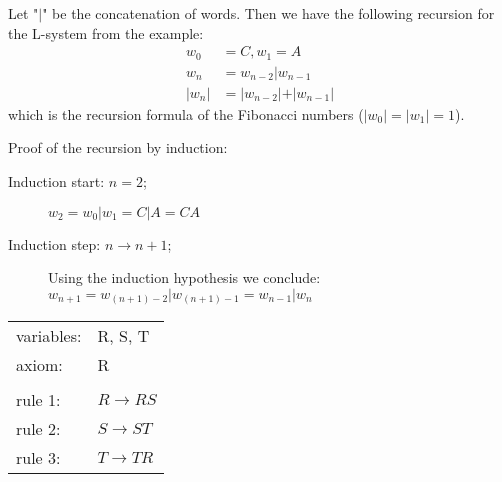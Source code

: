 \documentclass[10pt,a4paper,boxed]{hmcpset}
\begin{document}
\begin{problem}[Assignment 24]
\end{problem}
\begin{solution}
\end{solution}

\begin{problem}[Assignment 25]
\end{problem}
\begin{solution}
\end{solution}

\begin{problem}[Assignment 26]
\end{problem}
\begin{solution}
\end{solution}

\begin{problem}[Assignment 27]
\end{problem}
\begin{solution}
Let "$\vert$" be the concatenation of words. Then we have the following recursion for the L-system from the example:\\
\begin{align*}
	w_0 & = C, w_1 = A\\
	w_n & = w_{n-2} \vert w_{n-1} \\
	\vert w_n \vert & = \vert w_{n-2} \vert + \vert w_{n-1} \vert
\end{align*}
which is the recursion formula of the Fibonacci numbers ($\vert w_0 \vert = \vert w_1 \vert = 1$).

Proof of the recursion by induction:
	\begin{description}
		\item[Induction start: $n=2$;] $w_2 = w_0 \vert w_1 = C \vert A = CA$
		\item[Induction step: $n \rightarrow n+1$;] Using the induction hypothesis we conclude: $w_{n+1} = w_{(n+1)-2} \vert w_{(n+1)-1} = w_{n-1} \vert w_n$
	\end{description}
\end{solution}

\begin{problem}[Assignment 28]
\end{problem}
\begin{solution}
	\begin{tabular}{ll}
	 variables: & R, S, T\\ 
	 axiom: & R \\
	 		& \\
	 rule 1: & $R \rightarrow RS$ \\
	 rule 2: & $S \rightarrow ST$ \\
	 rule 3: & $T \rightarrow TR$ \\
	\end{tabular}
\end{solution}

\begin{problem}[Assignment 29]
\end{problem}
\begin{solution}
\end{solution}

\begin{problem}[Assignment 30]
\end{problem}
\begin{solution}
\end{solution}
\end{document}
